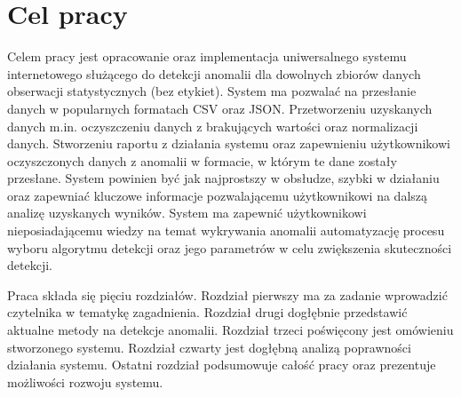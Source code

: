 \section{Cel pracy}
Celem pracy jest opracowanie oraz implementacja uniwersalnego systemu internetowego służącego do detekcji anomalii dla dowolnych zbiorów danych obserwacji statystycznych (bez etykiet). System ma pozwalać na przesłanie danych w popularnych formatach CSV oraz JSON. Przetworzeniu uzyskanych danych m.in. oczyszczeniu danych z brakujących wartości oraz normalizacji danych. Stworzeniu raportu z działania systemu oraz zapewnieniu użytkownikowi oczyszczonych danych z anomalii w formacie, w którym te dane zostały przesłane. System powinien być jak najprostszy w obsłudze, szybki w działaniu oraz zapewniać kluczowe informacje pozwalającemu użytkownikowi na dalszą analizę uzyskanych wyników. 
System ma zapewnić użytkownikowi nieposiadającemu wiedzy na temat wykrywania anomalii automatyzację procesu wyboru algorytmu detekcji oraz jego parametrów w celu zwiększenia skuteczności detekcji.


Praca składa się pięciu rozdziałów. Rozdział pierwszy ma za zadanie wprowadzić czytelnika w tematykę zagadnienia. Rozdział drugi dogłębnie przedstawić aktualne metody na detekcje anomalii. Rozdział trzeci poświęcony jest omówieniu stworzonego systemu. Rozdział czwarty jest dogłębną analizą poprawności działania systemu. Ostatni rozdział podsumowuje całość pracy oraz prezentuje możliwości rozwoju systemu. 